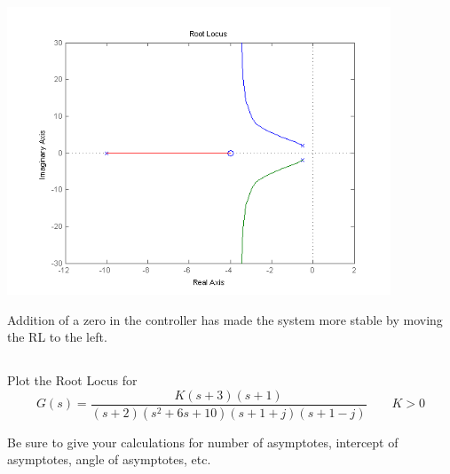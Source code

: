 \documentclass{article}	%
\begin{document}
\begin{solution}
\includegraphics[width=4.5in]{hw7_7.png}

Addition of a zero in the controller has made the system more stable by moving the RL to the left.
\end{solution}








\subsection{}
Plot the Root Locus for
\[
G(s) = \frac {K(s+3)(s+1)}
{(s+2)(s^2+6s+10)(s+1+j)(s+1-j)}  \qquad  K>0
\]



Be sure to give your calculations for number of asymptotes, intercept of asymptotes, angle of asymptotes, etc.
\end{document}
